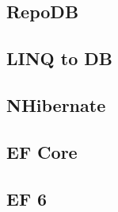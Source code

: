 \subsection{RepoDB}

\subsection{LINQ to DB}

\subsection{NHibernate}
\subsection{EF Core}
\subsection{EF 6}
